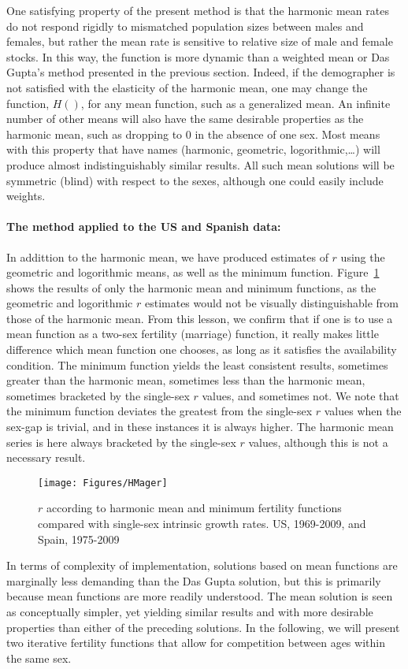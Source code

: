 One satisfying property of the present method is that the harmonic mean
rates do not respond rigidly to mismatched population sizes between males and
females, but rather the mean rate is sensitive to relative size of male and
female stocks. In this way, the function is more dynamic than a weighted mean
or Das Gupta's method presented in the previous section. Indeed, if the
demographer is not satisfied with the elasticity of the harmonic mean, one may
change the function, $H()$, for any mean function, such as a generalized mean.
An infinite number of other means will also have the same desirable properties as the harmonic mean, such as 
dropping to 0 in the absence of one sex. Most means with this property that have
names (harmonic, geometric, logorithmic,\ldots) will produce almost
indistinguishably similar results. All such mean solutions will be symmetric
(blind) with respect to the sexes, although one could easily include weights.

\paragraph{The method applied to the US and Spanish data: }
In addittion to the harmonic mean, we have produced estimates of $r$ using the
geometric and logorithmic means, as well as the minimum function.
Figure~\ref{fig:schoenr} shows the results of only the harmonic mean and minimum
functions, as the geometric and logorithmic $r$ estimates would not be visually
distinguishable from those of the harmonic mean. From this lesson, we confirm
that if one is to use a mean function as a two-sex fertility (marriage)
function, it really makes little difference which mean function one chooses, as long as it
satisfies the availability condition. The minimum function yields the least
consistent results, sometimes greater than the harmonic mean, sometimes less
than the harmonic mean, sometimes bracketed by the single-sex $r$ values, and
sometimes not. We note that the minimum function deviates the greatest from the
single-sex $r$ values when the sex-gap is trivial, and in these instances it is
always higher. The harmonic mean series is here always bracketed by the
single-sex $r$ values, although this is not a necessary result.

\begin{figure}[ht!]
        \centering  
          \caption{$r$ according to harmonic mean and minimum fertility
          functions compared with single-sex intrinsic growth rates. US,
          1969-2009, and Spain, 1975-2009}
           \texttt{[image: Figures/HMager]}
          \label{fig:schoenr}
\end{figure}

In terms of complexity of implementation, solutions based on mean functions are
marginally less demanding than the Das Gupta solution, but this is primarily
because mean functions are more readily understood. The mean solution is seen as
conceptually simpler, yet yielding similar results and with more desirable
properties than either of the preceding solutions. In the following, we will
present two iterative fertility functions that allow for competition between 
ages within the same sex.

\FloatBarrier
